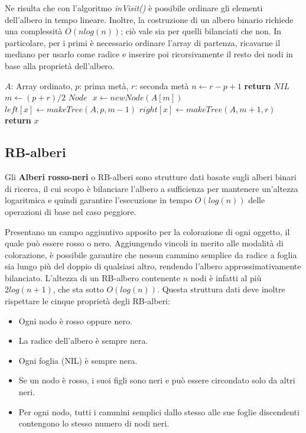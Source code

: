 \noindent Ne risulta che con l'algoritmo \textit{inVisit()} è possibile ordinare gli elementi dell'albero in tempo lineare. Inoltre, la costruzione di
un albero binario richiede una complessità $O(nlog(n))$; ciò vale sia per quelli bilanciati che non. In particolare, per i primi è necessario ordinare
l'array di partenza, ricavarne il mediano per usarlo come radice e inserire poi ricorsivamente il resto dei nodi in base alla proprietà dell'albero.
\begin{algorithm}[h]
	\caption{makeTree(A, p, r)}
	\begin{algorithmic}[1]
		\Require $A$: Array ordinato, $p$: prima metà, $r$: seconda metà
		\State $n\gets r-p+1$ 
		 
			\State \textbf{return} $NIL$
		\EndIf
		\State $m\gets (p+r)/2$ 
		\State $Node \text{ }x\gets new Node(A[m])$ 
		\State $left[x]\gets makeTree(A, p, m-1)$
		\State $right[x]\gets makeTree(A, m+1, r)$
		\State \textbf{return} $x$
	\end{algorithmic}
\end{algorithm}

\subsection{RB-alberi}
Gli \textbf{Alberi rosso-neri} o RB-alberi sono strutture dati basate sugli alberi binari di ricerca, il cui scopo è bilanciare l'albero a sufficienza
per mantenere un'altezza logaritmica e quindi garantire l'esecuzione in tempo $O(log(n))$ delle operazioni di base nel caso peggiore.\par
Presentano un campo aggiuntivo apposito per la colorazione di ogni oggetto, il quale può essere rosso o nero. Aggiungendo vincoli in merito alle
modalità di colorazione, è possibile garantire che nessun cammino semplice da radice a foglia sia lungo più del doppio di qualsiasi altro, rendendo
l'albero approssimativamente bilanciato. L'altezza di un RB-albero contenente $n$ nodi è infatti al più $2log(n+1)$, che sta sotto $O(log(n))$.
Questa struttura dati deve inoltre rispettare le cinque proprietà degli RB-alberi: \begin{itemize}
	\item Ogni nodo è rosso oppure nero.
	\item La radice dell'albero è sempre nera.
	\item Ogni foglia (NIL) è sempre nera.
	\item Se un nodo è rosso, i suoi figli sono neri e può essere circondato solo da altri neri.
	\item Per ogni nodo, tutti i cammini semplici dallo stesso alle sue foglie discendenti contengono lo stesso numero di nodi neri.
\end{itemize}

